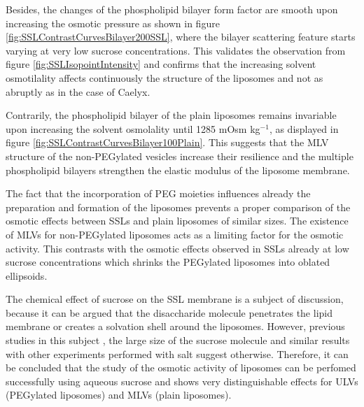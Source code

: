 %		

Besides, the changes of the phospholipid bilayer form factor are smooth upon increasing the osmotic pressure as shown in figure \ref{fig:SSLContrastCurvesBilayer200SSL}, where the bilayer scattering feature starts varying at very low sucrose concentrations. This validates the observation from figure \ref{fig:SSLIsopointIntensity} and confirms that the increasing solvent osmotilality affects continuously the structure of the liposomes and not as abruptly as in the case of Caelyx.

Contrarily, the phospholipid bilayer of the plain liposomes remains invariable upon increasing the solvent osmolality until 1285 mOsm kg$^{-1}$, as displayed in figure \ref{fig:SSLContrastCurvesBilayer100Plain}. This suggests that the MLV structure of the non-PEGylated vesicles increase their resilience and the multiple phospholipid bilayers strengthen the elastic modulus of the liposome membrane.

The fact that the incorporation of PEG moieties influences already the preparation and formation of the liposomes prevents a proper comparison of the osmotic effects between SSLs and plain liposomes of similar sizes. The existence of MLVs for non-PEGylated liposomes acts as a limiting factor for the osmotic activity. This contrasts with the osmotic effects observed in SSLs already at low sucrose concentrations which shrinks the PEGylated liposomes into oblated ellipsoids. 

The chemical effect of sucrose on the SSL membrane is a subject of discussion, because it can be argued that the disaccharide molecule penetrates the lipid membrane or creates a solvation shell around the liposomes. However, previous studies in this subject \citep{kiselev_does_2003, kiselev_sucrose_2001, kiselev_sucrose_2001-1}, the large size of the sucrose molecule and similar results with other experiments performed with salt \citep{varga_osmotic_2014} suggest otherwise. Therefore, it can be concluded that the study of the osmotic activity of liposomes can be perfomed successfully using aqueous sucrose and shows very distinguishable effects for ULVs (PEGylated liposomes) and MLVs (plain liposomes).

